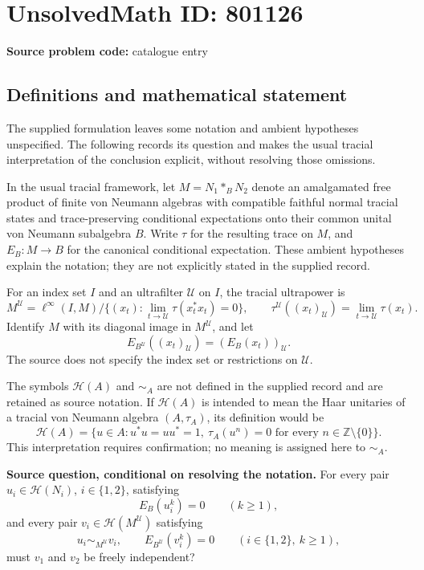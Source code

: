 \documentclass[11pt]{article}
\begin{document}
\section*{UnsolvedMath ID: 801126}
\textbf{Source problem code:} catalogue entry
\subsection{Definitions and mathematical statement}
The supplied formulation leaves some notation and ambient hypotheses unspecified. The following records its question and makes the usual tracial interpretation of the conclusion explicit, without resolving those omissions.

In the usual tracial framework, let \(M=N_1*_B N_2\) denote an amalgamated free product of finite von Neumann algebras with compatible faithful normal tracial states and trace-preserving conditional expectations onto their common unital von Neumann subalgebra \(B\). Write \(\tau\) for the resulting trace on \(M\), and \(E_B:M\to B\) for the canonical conditional expectation. These ambient hypotheses explain the notation; they are not explicitly stated in the supplied record.

For an index set \(I\) and an ultrafilter \(\mathcal U\) on \(I\), the tracial ultrapower is
\[
M^{\mathcal U}=\ell^\infty(I,M)\big/\{(x_t):\lim_{t\to\mathcal U}\tau(x_t^*x_t)=0\},
\qquad
\tau^{\mathcal U}((x_t)_{\mathcal U})=\lim_{t\to\mathcal U}\tau(x_t).
\]
Identify \(M\) with its diagonal image in \(M^{\mathcal U}\), and let
\[
E_{B^{\mathcal U}}((x_t)_{\mathcal U})=(E_B(x_t))_{\mathcal U}.
\]
The source does not specify the index set or restrictions on \(\mathcal U\).

The symbols \(\mathcal H(A)\) and \(\sim_A\) are not defined in the supplied record and are retained as source notation. If \(\mathcal H(A)\) is intended to mean the Haar unitaries of a tracial von Neumann algebra \((A,\tau_A)\), its definition would be
\[
\mathcal H(A)=\{u\in A:u^*u=uu^*=1,\ \tau_A(u^n)=0\text{ for every }n\in\mathbb Z\setminus\{0\}\}.
\]
This interpretation requires confirmation; no meaning is assigned here to \(\sim_A\).

\textbf{Source question, conditional on resolving the notation.} For every pair \(u_i\in\mathcal H(N_i)\), \(i\in\{1,2\}\), satisfying
\[
E_B(u_i^k)=0\qquad(k\geq1),
\]
and every pair \(v_i\in\mathcal H(M^{\mathcal U})\) satisfying
\[
u_i\sim_{M^{\mathcal U}}v_i,
\qquad E_{B^{\mathcal U}}(v_i^k)=0
\qquad(i\in\{1,2\},\ k\geq1),
\]
must \(v_1\) and \(v_2\) be freely independent?
\end{document}
